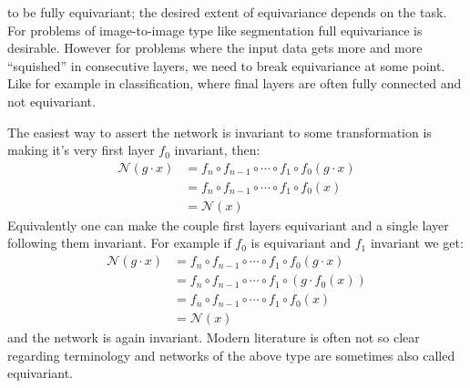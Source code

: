         to be fully equivariant; the desired extent of equivariance depends on the task.
        For problems of image-to-image type like segmentation full equivariance is desirable.
        However for problems where the input data gets more and more ``squished'' in consecutive layers,
        we need to break equivariance at some point. Like for example in classification,
        where final layers are often fully connected and not equivariant. \par
        The easiest way to assert the network is invariant to some transformation
        is making it's very first layer $f_0$ invariant, then:
        \begin{align*}
            \mathcal{N}(g\cdot x)
            &= f_n \circ f_{n-1} \circ \cdots \circ f_1 \circ f_0(g\cdot x)  \\
            &= f_n \circ f_{n-1} \circ \cdots \circ f_1 \circ f_0(x) \\
            &= \mathcal{N}(x)
        \end{align*}
        Equivalently one can make the couple first layers equivariant and a single layer
        following them invariant. For example if $f_0$ is equivariant and $f_1$ invariant we get:
        \begin{align*}
            \mathcal{N}(g\cdot x)
            &= f_n \circ f_{n-1} \circ \cdots \circ f_1 \circ f_0(g\cdot x)  \\
            &= f_n \circ f_{n-1} \circ \cdots \circ f_1 \circ \left( g \cdot f_0(x) \right) \\
            &= f_n \circ f_{n-1} \circ \cdots \circ f_1 \circ f_0(x) \\
            &= \mathcal{N}(x)
        \end{align*}
        and the network is again invariant. Modern literature is often not so
        clear regarding terminology and networks of the above type are sometimes
        also called equivariant.


